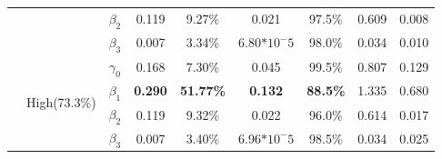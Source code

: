 \documentclass{svjour3}\usepackage[]{graphicx}\usepackage[]{color}
\begin{document}
\begin{table}[p]
\begin{tabular}{c|c|c|cccccc}
		&& $\beta_2$ & 0.119 & 9.27\% & 0.021 & 97.5\% & 0.609 & 0.008 \\
		&& $\beta_3$ & 0.007 & 3.34\% & 6.80$*10^-5$ & 98.0\% & 0.034 & 0.010 \\ \cline{2-9} \noalign{\smallskip}
		& \multirow{4}{*}{High(73.3\%)}
		& $\gamma_0$ & 0.168 & 7.30\% & 0.045 & 99.5\% & 0.807 & 0.129 \\
		&& $\beta_1$ & \textbf{0.290} & \textbf{51.77\%} & \textbf{0.132} & \textbf{88.5\%} & 1.335 & 0.680 \\
		&& $\beta_2$ & 0.119 & 9.32\% & 0.022 & 96.0\% & 0.614 & 0.017 \\
		&& $\beta_3$ & 0.007 & 3.40\% & 6.96$*10^-5$ & 98.5\% & 0.034 & 0.025 \\
		\bottomrule
	\end{tabular}
\end{table}
\end{document}
